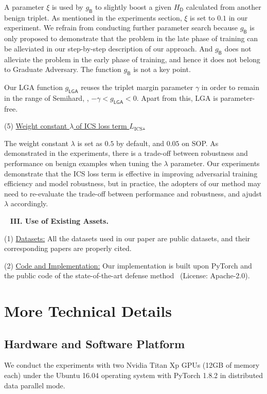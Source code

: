 A parameter $\xi$ is used by $g_\mathsf{B}$ to slightly boost a given
$H_\mathsf{D}$ calculated from another benign triplet.
%
As mentioned in the experiments section, $\xi$ is set to $0.1$ in our
experiment.
%
We refrain from conducting further parameter search because $g_\mathsf{B}$
is only proposed to demonstrate that the problem in the late phase of
training can be alleviated in our step-by-step description of our approach.
%
And $g_\mathsf{B}$ does not alleviate the problem in the early phase of
training, and hence it does not belong to Graduate Adversary.
%
The function $g_\mathsf{B}$ is not a key point.

Our LGA function $g_\mathsf{LGA}$ reuses the triplet margin parameter $\gamma$
in order to remain in the range of Semihard, \ie, $-\gamma<g_\mathsf{LGA}<0$.
%
Apart from this, LGA is parameter-free.

(5) \ul{Weight constant $\lambda$ of ICS loss term $L_\text{ICS}$.}

The weight constant $\lambda$ is set as $0.5$ by default, and $0.05$ on SOP.
%
As demonstrated in the experiments, there is a trade-off between robustness and
performance on benign examples when tuning the $\lambda$ parameter.
%
Our experiments demonstrate that the ICS loss term is effective in improving
adversarial training efficiency and model robustness, but in practice, the
adopters of our method may need to re-evaluate the trade-off between
performance and robustness, and ajudst $\lambda$ accordingly.

~\newline
\noindent\textbf{III. Use of Existing Assets.}

(1) \ul{Datasets:} All the datasets used in our paper are public datasets,
and their corresponding papers are properly cited.

(2) \ul{Code and Implementation:} Our implementation is built upon PyTorch
and the public code of the state-of-the-art defense method~\cite{robrank}
(License: Apache-2.0).

\section{More Technical Details}
\label{sec:b}

\subsection{Hardware and Software Platform}

We conduct the experiments with two Nvidia Titan Xp GPUs (12GB of memory each)
under the Ubuntu 16.04 operating system with PyTorch 1.8.2 in distributed data
parallel mode.

